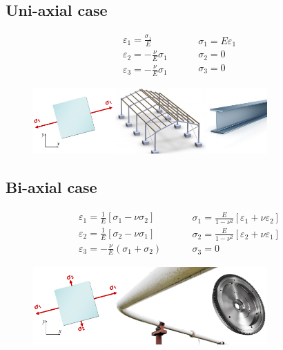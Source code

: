 \documentclass[class=report, crop=false, 12pt,a4paper]{standalone}
\begin{document}
\subsection{Uni-axial case}
\begin{equation}
    \begin{array}{l}
        \varepsilon_1 = \frac{\sigma_1}{E}\\
        \varepsilon_2 =-\frac{\nu}{E}\sigma_1\\
        \varepsilon_3 =-\frac{\nu}{E}\sigma_1    
    \end{array} \hspace{1cm} \begin{array}{l}
        \sigma_1 = E\varepsilon_1\\
        \sigma_2 = 0\\
        \sigma_3 = 0
    \end{array}
\end{equation}
\begin{figure}[H]
    \centering
    \includegraphics[width = 0.8\textwidth]{../img/diagram68.png}
    \caption{}
\end{figure}
\subsection{Bi-axial case}
\begin{equation}
    \begin{array}{l}
        \varepsilon_1 = \frac{1}{E}\left[\sigma_1-\nu\sigma_2\right]\\
        \varepsilon_2 = \frac{1}{E}\left[\sigma_2-\nu\sigma_1\right]\\
        \varepsilon_3 =-\frac{\nu}{E}\left(\sigma_1 + \sigma_2\right)    
    \end{array} \hspace{1cm} \begin{array}{l}
        \sigma_1 = \frac{E}{1-\nu^2}\left[\varepsilon_1 + \nu \varepsilon_2\right]\\
        \sigma_2 = \frac{E}{1-\nu^2}\left[\varepsilon_2 + \nu \varepsilon_1\right]\\
        \sigma_3 = 0
    \end{array}
\end{equation}
\begin{figure}[H]
    \centering
    \includegraphics[width = 0.8\textwidth]{../img/diagram69.png}
    \caption{}
\end{figure}
\end{document}
